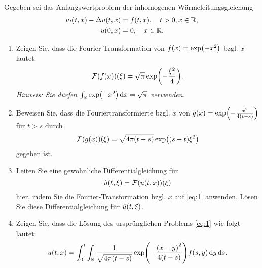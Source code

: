 \documentclass{exercise}
\begin{document}
    \begin{problem}
        Gegeben sei das Anfangswertproblem der inhomogenen Wärmeleitungsgleichung
        \begin{align}
            u_t\parentheses*{t, x} - \Delta u\parentheses*{t, x} &= f\parentheses*{t, x}, \quad t > 0, x \in \R, \label{eq:1}\\
            u\parentheses*{0, x} &= 0, \quad x \in \R. \nonumber
        \end{align}
        \begin{enumerate}
            \item Zeigen Sie, dass die Fourier-Transformation von \(f\parentheses*{x} = \exp\parentheses*{-x^2}\) bzgl. \(x\) lautet:
            \[
                \mathcal{F}\parentheses*{f\parentheses*{x}}\parentheses*{\xi} = \sqrt{\pi}\exp\parentheses*{-\frac{\xi^2}{4}}.
            \]
            \emph{Hinweis: Sie dürfen \(\int_\R \exp\parentheses*{-x^2}\d x = \sqrt{\pi}\) verwenden.}
            \item Beweisen Sie, dass die Fouriertransformierte bzgl. \(x\) von \(g\parentheses*{x} = \exp\parentheses*{-\frac{x^2}{4\parentheses*{t - s}}}\) für \(t > s\) durch
            \[
                \mathcal{F}\parentheses*{g\parentheses*{x}}\parentheses*{\xi} = \sqrt{4\pi\parentheses*{t - s}}\exp\parentheses*{\parentheses*{s - t}\xi^2}
            \]
            gegeben ist.
            \item Leiten Sie eine gewöhnliche Differentialgleichung für
            \[
                \hat{u}\parentheses*{t, \xi} = \mathcal{F}\parentheses*{u\parentheses*{t, x}}\parentheses*{\xi}
            \]
            hier, indem Sie die Fourier-Transformation bzgl. \(x\) auf \eqref{eq:1} anwenden.
            Lösen Sie diese Differentialgleichung für \(\hat{u}\parentheses*{t, \xi}\).
            \item Zeigen Sie, dass die Lösung des ursprünglichen Problems \eqref{eq:1} wie folgt lautet:
            \[
                u\parentheses*{t, x} = \int_0^t \int_\R \frac{1}{\sqrt{4\pi\parentheses*{t - s}}}\exp\parentheses*{-\frac{\parentheses*{x - y}^2}{4\parentheses*{t - s}}}f\parentheses*{s, y}\d y\d s.
            \]
        \end{enumerate}
    \end{problem}
    
\end{document}
